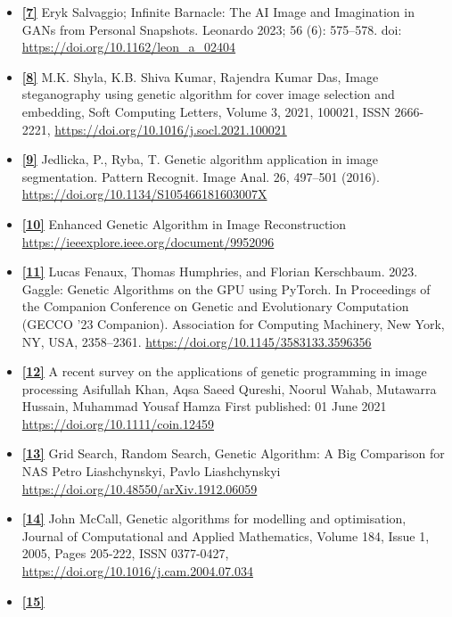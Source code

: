 \documentclass[10pt, conference]{IEEEtran}
\begin{document}
\begin{itemize}
	\item \textbf{\hyperref[sec:7]{[7]}\label{sec:7r}}	      Eryk Salvaggio; Infinite Barnacle: The AI Image and Imagination in GANs from Personal Snapshots. Leonardo 2023; 56 (6): 575–578. doi: \url{https://doi.org/10.1162/leon_a_02404}

	\item \textbf{\hyperref[sec:8]{[8]}\label{sec:8r}}      M.K. Shyla, K.B. Shiva Kumar, Rajendra Kumar Das,
	      Image steganography using genetic algorithm for cover image selection and embedding,
	      Soft Computing Letters,
	      Volume 3,
	      2021,
	      100021,
	      ISSN 2666-2221,
	      \url{https://doi.org/10.1016/j.socl.2021.100021}
	\item \textbf{\hyperref[sec:9]{[9]}\label{sec:9r}}	      Jedlicka, P., Ryba, T. Genetic algorithm application in image segmentation. Pattern Recognit. Image Anal. 26, 497–501 (2016). \url{https://doi.org/10.1134/S105466181603007X}
	\item \textbf{\hyperref[sec:10]{[10]}\label{sec:10r}}
	      Enhanced Genetic Algorithm in Image Reconstruction \url{https://ieeexplore.ieee.org/document/9952096}
	\item \textbf{\hyperref[sec:11]{[11]}\label{sec:11r}} Lucas Fenaux, Thomas Humphries, and Florian Kerschbaum. 2023. Gaggle: Genetic Algorithms on the GPU using PyTorch. In Proceedings of the Companion Conference on Genetic and Evolutionary Computation (GECCO '23 Companion). Association for Computing Machinery, New York, NY, USA, 2358–2361. \url{https://doi.org/10.1145/3583133.3596356 }
	\item \textbf{\hyperref[sec:12]{[12]}\label{sec:12r}} A recent survey on the applications of genetic programming in image processing
	      Asifullah Khan, Aqsa Saeed Qureshi, Noorul Wahab, Mutawarra Hussain, Muhammad Yousaf Hamza
	      First published: 01 June 2021 \url{https://doi.org/10.1111/coin.12459}
	\item \textbf{\hyperref[sec:13]{[13]}\label{sec:13r}} Grid Search, Random Search, Genetic Algorithm: A Big Comparison for NAS
	      Petro Liashchynskyi, Pavlo Liashchynskyi \url{https://doi.org/10.48550/arXiv.1912.06059}
	\item \textbf{\hyperref[sec:14]{[14]}\label{sec:14r}} John McCall,
	      Genetic algorithms for modelling and optimisation,
	      Journal of Computational and Applied Mathematics,
	      Volume 184, Issue 1,
	      2005,
	      Pages 205-222,
	      ISSN 0377-0427, \url{https://doi.org/10.1016/j.cam.2004.07.034}
	\item \textbf{\hyperref[sec:15]{[15]}\label{sec:15r}}

\end{itemize}
\end{document}
